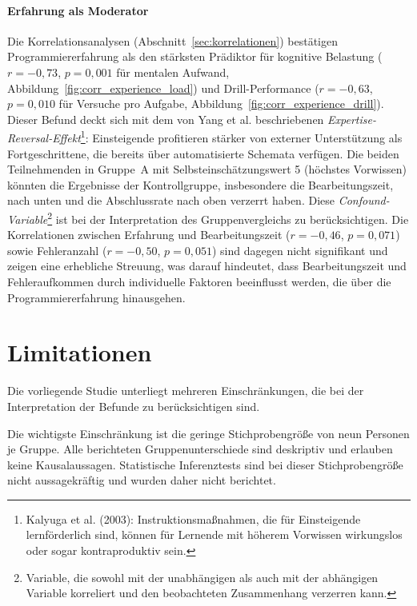 \paragraph{Erfahrung als Moderator}

Die Korrelationsanalysen (Abschnitt~\ref{sec:korrelationen}) bestätigen Programmiererfahrung als den stärksten Prädiktor für kognitive Belastung (\(r = -0{,}73\), \(p = 0{,}001\) für mentalen Aufwand, Abbildung~\ref{fig:corr_experience_load}) und Drill-Performance (\(r = -0{,}63\), \(p = 0{,}010\) für Versuche pro Aufgabe, Abbildung~\ref{fig:corr_experience_drill}). Dieser Befund deckt sich mit dem von Yang et al. beschriebenen \textit{Expertise-Reversal-Effekt}\footnote{Kalyuga et al. (2003): Instruktionsmaßnahmen, die für Einsteigende lernförderlich sind, können für Lernende mit höherem Vorwissen wirkungslos oder sogar kontraproduktiv sein.}: Einsteigende profitieren stärker von externer Unterstützung als Fortgeschrittene, die bereits über automatisierte Schemata verfügen. Die beiden Teilnehmenden in Gruppe~A mit Selbsteinschätzungswert 5 (höchstes Vorwissen) könnten die Ergebnisse der Kontrollgruppe, insbesondere die Bearbeitungszeit, nach unten und die Abschlussrate nach oben verzerrt haben. Diese \textit{Confound-Variable}\footnote{Variable, die sowohl mit der unabhängigen als auch mit der abhängigen Variable korreliert und den beobachteten Zusammenhang verzerren kann.} ist bei der Interpretation des Gruppenvergleichs zu berücksichtigen. Die Korrelationen zwischen Erfahrung und Bearbeitungszeit (\(r = -0{,}46\), \(p = 0{,}071\)) sowie Fehleranzahl (\(r = -0{,}50\), \(p = 0{,}051\)) sind dagegen nicht signifikant und zeigen eine erhebliche Streuung, was darauf hindeutet, dass Bearbeitungszeit und Fehleraufkommen durch individuelle Faktoren beeinflusst werden, die über die Programmiererfahrung hinausgehen.

\clearpage

\section{Limitationen}\label{sec:limitationen}

Die vorliegende Studie unterliegt mehreren Einschränkungen, die bei der Interpretation der Befunde zu berücksichtigen sind.

Die wichtigste Einschränkung ist die geringe Stichprobengröße von neun Personen je Gruppe. Alle berichteten Gruppenunterschiede sind deskriptiv und erlauben keine Kausalaussagen. Statistische Inferenztests sind bei dieser Stichprobengröße nicht aussagekräftig und wurden daher nicht berichtet.

